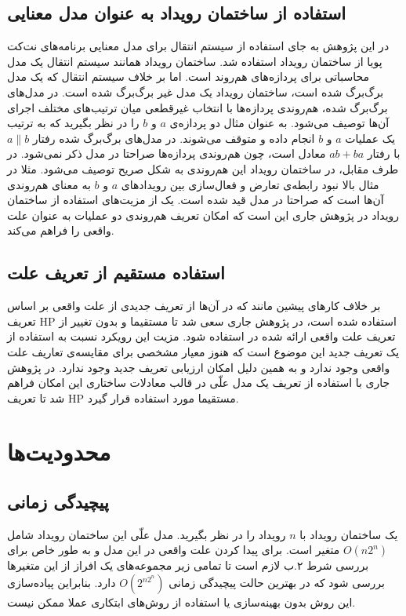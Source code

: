 \documentclass[
msc,
irfonts
]{./tex/tehran-thesis}
\newcommand{\پ}{پروژه/پایان‌نامه/رساله }
\theoremstyle{definition}
\theoremstyle{theorem}
\theoremstyle{definition}
\numberwithin{algorithm}{chapter}
\begin{document}
 \subsection{استفاده از ساختمان رویداد به عنوان مدل معنایی}
در این پژوهش به جای استفاده از سیستم انتقال برای مدل معنایی برنامه‌های نت‌کت پویا از ساختمان رویداد استفاده شد.
ساختمان رویداد همانند سیستم انتقال یک مدل محاسباتی برای پردازه‌های هم‌روند است. 
اما بر خلاف سیستم انتقال که یک مدل برگ‌برگ شده است، ساختمان رویداد یک مدل غیر برگ‌برگ شده است.
در مدل‌های برگ‌برگ‌ شده، هم‌روندی پردازه‌ها با انتخاب غیرقطعی میان ترتیب‌های مختلف اجرای آن‌ها توصیف می‌شود.
به عنوان مثال دو پردازه‌ی 
$a$
و
$b$
را در نظر بگیرید که به ترتیب یک عملیات 
$a$
و
$b$
انجام داده و متوقف می‌شوند.
در مدل‌های برگ‌برگ‌ شده رفتار 
$a\parallel b$
با رفتار 
$ab + ba$
معادل است، چون هم‌روندی پردازه‌ها صراحتا در مدل ذکر نمی‌شود.
در طرف مقابل، در ساختمان رویداد این هم‌روندی به شکل صریح توصیف می‌شود.
مثلا در مثال بالا نبود رابطه‌ی تعارض و فعال‌سازی بین رویداد‌های 
$a$
و
$b$
به معنای هم‌روندی آن‌ها است که صراحتا در مدل قید شده است.
یک از مزیت‌های استفاده از ساختمان رویداد در پژوهش جاری این است که امکان تعریف هم‌روندی دو عملیات به عنوان علت واقعی را فراهم می‌کند.


 \subsection{استفاده مستقیم از تعریف علت}
بر خلاف کار‌های پیشین مانند
\cite{decomposing,causality-checking,Caltais-LTL,causal-hml}
که در آن‌ها از تعریف جدیدی از علت واقعی بر اساس تعریف 
HP
استفاده شده است، در پژوهش جاری سعی شد تا مستقیما و بدون تغییر از تعریف علت واقعی ارائه شده در 
\cite{hp}
استفاده شود.
مزیت این رویکرد نسبت به استفاده از یک تعریف جدید این موضوع است که هنوز معیار مشخصی برای مقایسه‌ی تعاریف علت واقعی وجود ندارد و به همین دلیل امکان ارزیابی تعریف جدید وجود ندارد.
در پژوهش جاری با استفاده از تعریف یک مدل علّی در قالب معادلات ساختاری این امکان فراهم شد تا تعریف 
HP
مستقیما مورد استفاده قرار گیرد.

\section{محدودیت‌ها}
\subsection{پیچیدگی زمانی}
یک ساختمان رویداد با 
$n$
رویداد را در نظر بگیرید.
مدل علّی این ساختمان رویداد شامل 
$O(n2^n)$
متغیر است.
برای پیدا کردن علت واقعی در این مدل و به طور خاص برای بررسی شرط ۲.ب لازم است تا تمامی زیر مجموعه‌های یک افراز از این متغیر‌ها بررسی شود که در بهترین حالت پیچیدگی زمانی
$O(2^{n2^n})$
دارد.
بنابراین پیاده‌سازی این روش بدون بهینه‌سازی یا استفاده از روش‌های ابتکاری عملا ممکن نیست.
\end{document}
